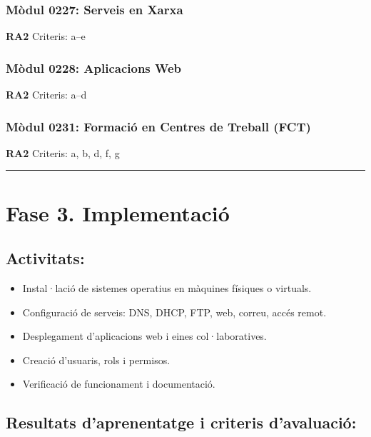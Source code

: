 \documentclass[
  a4paper,
]{article}
\providecommand{\tightlist}{%
  \setlength{\itemsep}{0pt}\setlength{\parskip}{0pt}}
\begin{document}
\subsubsection{Mòdul 0227: Serveis en
Xarxa}\label{muxf2dul-0227-serveis-en-xarxa-1}

\textbf{RA2} Criteris: a--e

\subsubsection{Mòdul 0228: Aplicacions
Web}\label{muxf2dul-0228-aplicacions-web-1}

\textbf{RA2} Criteris: a--d

\subsubsection{Mòdul 0231: Formació en Centres de Treball
(FCT)}\label{muxf2dul-0231-formaciuxf3-en-centres-de-treball-fct-1}

\textbf{RA2} Criteris: a, b, d, f, g

\begin{center}\rule{0.5\linewidth}{0.5pt}\end{center}

\section{Fase 3. Implementació}\label{fase-3.-implementaciuxf3}

\subsection{Activitats:}\label{activitats-2}

\begin{itemize}
\tightlist
\item
  Instal·lació de sistemes operatius en màquines físiques o virtuals.
\item
  Configuració de serveis: DNS, DHCP, FTP, web, correu, accés remot.
\item
  Desplegament d'aplicacions web i eines col·laboratives.
\item
  Creació d'usuaris, rols i permisos.
\item
  Verificació de funcionament i documentació.
\end{itemize}

\subsection{Resultats d'aprenentatge i criteris
d'avaluació:}\label{resultats-daprenentatge-i-criteris-davaluaciuxf3-2}
\end{document}
